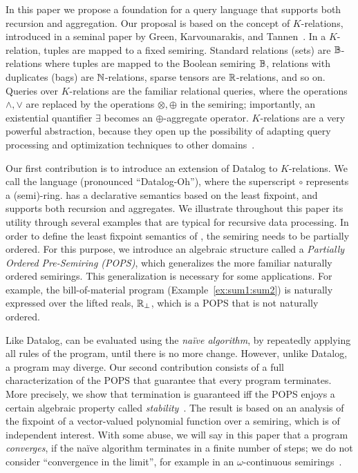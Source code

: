 In this paper we propose a foundation for a query language that
supports both recursion and aggregation.  Our proposal is based on the
concept of $K$-relations, introduced in a seminal
paper by Green, Karvounarakis, and Tannen~\cite{DBLP:conf/pods/GreenKT07}.
In a $K$-relation, tuples are
mapped to a fixed semiring. Standard relations (sets) are
$\mathbb B$-relations where tuples are mapped to the Boolean semiring $\mathbb B$,
relations with duplicates (bags) are $\mathbb N$-relations, sparse tensors
are $\mathbb R$-relations, and so on.  Queries over $K$-relations are the
familiar relational queries, where the operations $\wedge, \vee$ are
replaced by the operations $\otimes, \oplus$ in the semiring;
importantly, an existential quantifier $\exists$ becomes an
$\oplus$-aggregate operator.
$K$-relations are a very powerful abstraction, because they open up
the possibility of adapting query processing and optimization
techniques to other domains~\cite{DBLP:conf/pods/KhamisNR16}.

Our first contribution is to introduce an extension of Datalog to
$K$-relations.  We call the language \datalogo 
 (pronounced ``Datalog-Oh''),
 where the superscript
$\circ$ represents a (semi)-ring. \datalogo has a declarative semantics
based on the least fixpoint, and supports both recursion and
aggregates.  We illustrate throughout this paper its utility through
several examples that are typical for recursive data processing.  In
order to define the least fixpoint semantics of \datalogo, the semiring
needs to be partially ordered.  For this purpose, we introduce an
algebraic structure called a {\em Partially Ordered Pre-Semiring (POPS)\/},
which generalizes the more familiar naturally ordered semirings.  This
generalization is necessary for some applications.  For example, the
bill-of-material program (Example~\ref{ex:sum1:sum2}) is naturally
expressed over the lifted reals, $\mathbb R_\bot$, which is a POPS that is
not naturally ordered.

Like Datalog, \datalogo can be evaluated using the {\em na\"ive algorithm},
by repeatedly applying all rules of the program, until there is no
more change.  However, unlike Datalog, a \datalogo program may diverge.
Our second contribution consists of a full characterization of the
POPS that guarantee that every \datalogo program terminates.  More
precisely, we show that termination is guaranteed iff the POPS enjoys
a certain algebraic property called {\em
  stability}~\cite{semiring_book}.  The result is based on an analysis
of the fixpoint of a vector-valued polynomial function over a semiring, which is of
independent interest.  With some abuse, we will say in this paper that
a \datalogo program {\em converges}, if the na\"ive algorithm terminates
in a finite number of steps; we do not consider ``convergence in the
limit'', for example in an $\omega$-continuous
semirings~\cite{DBLP:conf/pods/GreenKT07,DBLP:journals/jacm/EsparzaKL10}.

